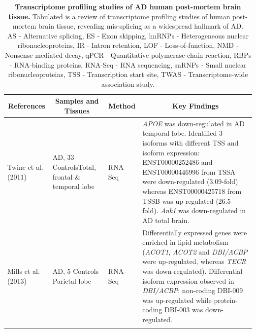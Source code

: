 \begin{landscape}
	\small %
	\setlength\tabcolsep{2pt} %
	\renewcommand{\arraystretch}{1}
	\begin{longtable}[c]{p{3cm}p{4cm}p{3cm}p{16cm}}
		\caption[Transcriptome profiling studies of AD human post-mortem brain tissue]%
		{\textbf{Transcriptome profiling studies of AD human post-mortem brain tissue.} Tabulated is a review of transcriptome profiling studies of human post-mortem brain tissue, revealing mis-splicing as a widespread hallmark of AD. \newline AS - Alternative splicing, ES - Exon skipping, hnRNPs - Heterogeneous nuclear ribonucleoproteins, IR - Intron retention, LOF - Loss-of-function, NMD - Nonsense-mediated decay, qPCR - Quantitative polymerase chain reaction, RBPs - RNA-binding proteins, RNA-Seq - RNA sequencing, snRNPs - Small nuclear ribonucleoproteins, TSS - Transcription start site, TWAS - Transcriptome-wide association study.}
		\label{tab: AS_ADHuman_studies}\\
		
		\toprule
		\multicolumn{1}{c}{References} &
		\multicolumn{1}{c}{Samples and Tissues} &
		\multicolumn{1}{c}{Method} &
		\multicolumn{1}{c}{Key Findings} \\* \midrule
		\endfirsthead
		\endhead
		\bottomrule
		\endfoot
		\endlastfoot
		\centering Twine et al. (2011)\cite{Twine2011} &
		\centering 3 AD, 33 Controls\newline Total, frontal \& temporal lobe &
		\centering RNA-Seq &
		\tabitem \textit{APOE} was down-regulated in AD temporal lobe. Identified 3 isoforms with different TSS and isoform expression: ENST00000252486 and ENST00000446996 from TSSA were down-regulated (3.09-fold) whereas ENST00000425718 from TSSB was up-regulated (26.5-fold). \newline
		\tabitem \textit{Ank1} was down-regulated in AD total brain. \\
		\hdashline[0.5pt/5pt]
		
		\centering Mills et al. (2013)\cite{Mills2013} &
		\centering 5 AD, 5 Controls \newline Parietal lobe &
		\centering RNA-Seq &
		\tabitem Differentially expressed genes were enriched in lipid metabolism (\textit{ACOT1}, \textit{ACOT2} and \textit{DBI/ACBP} were up-regulated, whereas \textit{TECR} was down-regulated). \newline
		\tabitem Differential isoform expression observed in \textit{DBI/ACBP}: non-coding DBI-009 was up-regulated while protein-coding DBI-003 was down-regulated. \\
		\hdashline[0.5pt/5pt]
		

\end{longtable}
\end{landscape}
